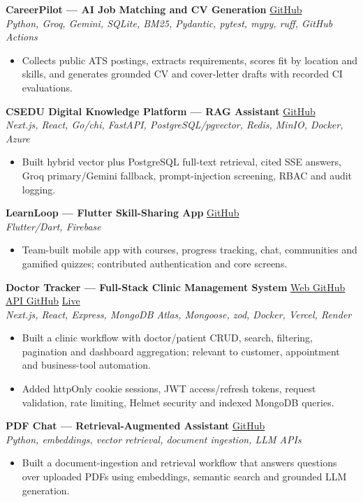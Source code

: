 \documentclass[10pt,a4paper]{article}
\newcommand{\project}[3]{\textbf{#1} \hfill {\small #2}\\{\small\textit{#3}}\par}
\begin{document}
\project{CareerPilot --- AI Job Matching and CV Generation}
{\href{https://github.com/Mayamoho/career-pilot}{GitHub}}
{Python, Groq, Gemini, SQLite, BM25, Pydantic, pytest, mypy, ruff, GitHub Actions}
\begin{itemize}
\item Collects public ATS postings, extracts requirements, scores fit by location and skills, and generates grounded CV and cover-letter drafts with recorded CI evaluations.
\end{itemize}

\project{CSEDU Digital Knowledge Platform --- RAG Assistant}
{\href{https://github.com/Mayamoho/CSEDU-Digital-Knowledge-Platform-main}{GitHub}}
{Next.js, React, Go/chi, FastAPI, PostgreSQL/pgvector, Redis, MinIO, Docker, Azure}
\begin{itemize}
\item Built hybrid vector plus PostgreSQL full-text retrieval, cited SSE answers, Groq primary/Gemini fallback, prompt-injection screening, RBAC and audit logging.
\end{itemize}

\project{LearnLoop --- Flutter Skill-Sharing App}
{\href{https://github.com/Mayamoho/learnloop}{GitHub}}
{Flutter/Dart, Firebase}
\begin{itemize}
\item Team-built mobile app with courses, progress tracking, chat, communities and gamified quizzes; contributed authentication and core screens.
\end{itemize}

\project{Doctor Tracker --- Full-Stack Clinic Management System}
{\href{https://github.com/Mayamoho/doctor-tracker-web}{Web GitHub} \textbar{} \href{https://github.com/Mayamoho/doctor-tracker-api}{API GitHub} \textbar{} \href{https://doctor-tracker-web-one.vercel.app}{Live}}
{Next.js, React, Express, MongoDB Atlas, Mongoose, zod, Docker, Vercel, Render}
\begin{itemize}
\item Built a clinic workflow with doctor/patient CRUD, search, filtering, pagination and dashboard aggregation; relevant to customer, appointment and business-tool automation.
\item Added httpOnly cookie sessions, JWT access/refresh tokens, request validation, rate limiting, Helmet security and indexed MongoDB queries.
\end{itemize}

\project{PDF Chat --- Retrieval-Augmented Assistant}
{\href{https://github.com/Mayamoho/pdf-chat-app}{GitHub}}
{Python, embeddings, vector retrieval, document ingestion, LLM APIs}
\begin{itemize}
\item Built a document-ingestion and retrieval workflow that answers questions over uploaded PDFs using embeddings, semantic search and grounded LLM generation.
\end{itemize}
\end{document}
